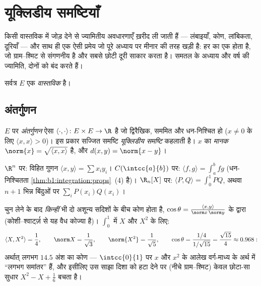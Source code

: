 \chapter{यूक्लिडीय समष्टियाँ}\label{ch:b1:euclid}

किसी वास्तविक  में  जोड़ देने से ज्यामितीय अवधारणाएँ
ख़रीद ली जाती हैं --- लंबाइयाँ, कोण, लांबिकता, दूरियाँ --- और साथ ही एक ऐसी
प्रमेय जो पूरे अध्याय पर मीनार की तरह खड़ी है: हर  का एक  होता है, जो ग्राम--श्मिट से संगणनीय है और सबसे छोटी दूरी साकार करता
है। समतल के  अध्याय और वर्ष की ज्यामिति, दोनों को बंद करते हैं।

सर्वत्र $E$ एक \emph{वास्तविक}  है।

\section{अंतर्गुणन}

\begin{definition}\label{def:b1:euclid:def}
$E$ पर \emph{अंतर्गुणन} ऐसा 
$\langle\cdot,\cdot\rangle \colon E \times E \to \R$ है जो द्विरैखिक, सममित
और धन-निश्चित हो ($x \neq 0$ के लिए $\langle x, x\rangle > 0$)। इस प्रकार
सज्जित  समष्टि \emph{यूक्लिडीय समष्टि}
कहलाती है। $x$ का \emph{मानक} $\norm{x} = \sqrt{\langle x, x\rangle}$ है, और
$d(x, y) = \norm{x - y}$।
\end{definition}

\begin{example}\label{ex:b1:euclid:examples}
$\R^n$ पर: विहित गुणन $\langle x, y\rangle = \sum x_i y_i$।
$C(\intcc{a}{b})$ पर: $\langle f, g \rangle = \int_a^b fg$ (धन-निश्चितता
\cref{thm:b1:integration:props}~(4) है)। $\R_n[X]$ पर: $\langle P, Q\rangle
= \int_0^1 PQ$, अथवा $n+1$ भिन्न बिंदुओं पर $\sum_{i} P(x_i)Q(x_i)$।
\end{example}

\begin{example}[दो बहुपदों के बीच का कोण]
\label{ex:b1:euclid:polyangle}
 चुन लेने के बाद \emph{किन्हीं} भी दो अशून्य सदिशों के बीच कोण होता
है, $\cos\theta = \frac{\langle x, y\rangle}{\norm x\,\norm y}$ के द्वारा
(कोशी--श्वार्ट्ज़ से यह वैध कोज्या है)। $\int_0^1$ में $X$ और $X^2$ के लिए:
\[
\langle X, X^2\rangle = \frac14, \qquad
\norm X = \frac1{\sqrt3}, \qquad \norm{X^2} = \frac1{\sqrt5},
\qquad
\cos\theta = \frac{1/4}{1/\sqrt{15}} = \frac{\sqrt{15}}{4}
\approx 0.968 :
\]
अर्थात् लगभग $14.5$ अंश का कोण --- $\intcc{0}{1}$ पर $x$ और $x^2$ के आलेख
वर्ग-माध्य के अर्थ में ``लगभग समांतर'' हैं, और इसीलिए उस साझा दिशा को हटा
देने पर (नीचे ग्राम--श्मिट) केवल छोटा-सा सुधार $X^2 - X + \frac16$ बचता है।
\end{example}


